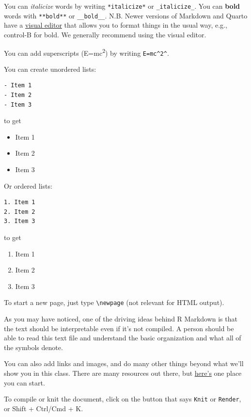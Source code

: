 \documentclass[
  letterpaper,
  DIV=11,
  numbers=noendperiod]{scrreprt}
\providecommand{\tightlist}{%
  \setlength{\itemsep}{0pt}\setlength{\parskip}{0pt}}\usepackage{longtable,booktabs,array}
\begin{document}
You can \emph{italicize} words by writing \texttt{*italicize*} or
\texttt{\_italicize\_}. You can \textbf{bold} words with
\texttt{**bold**} or \texttt{\_\_bold\_\_}. N.B. Newer versions of
Markdown and Quarto have a
\href{https://rstudio.github.io/visual-markdown-editing/}{visual editor}
that allows you to format things in the usual way, e.g., control-B for
bold. We generally recommend using the visual editor.

You can add superscripts (E=mc\textsuperscript{2}) by writing
\texttt{E=mc\^{}2\^{}}.

You can create unordered lists:

\begin{verbatim}
- Item 1
- Item 2
- Item 3
\end{verbatim}

to get

\begin{itemize}
\tightlist
\item
  Item 1
\item
  Item 2
\item
  Item 3
\end{itemize}

Or ordered lists:

\begin{verbatim}
1. Item 1
2. Item 2
3. Item 3
\end{verbatim}

to get

\begin{enumerate}
\def\labelenumi{\arabic{enumi}.}
\tightlist
\item
  Item 1
\item
  Item 2
\item
  Item 3
\end{enumerate}

To start a new page, just type \texttt{\textbackslash{}newpage} (not
relevant for HTML output).

As you may have noticed, one of the driving ideas behind R Markdown is
that the text should be interpretable even if it's not compiled. A
person should be able to read this text file and understand the basic
organization and what all of the symbols denote.

You can also add links and images, and do many other things beyond what
we'll show you in this class. There are many resources out there, but
\href{https://rmarkdown.rstudio.com/lesson-1.html}{here's} one place you
can start.

To compile or knit the document, click on the button that says
\texttt{Knit} or \texttt{Render}, or Shift + Ctrl/Cmd + K.
\end{document}
